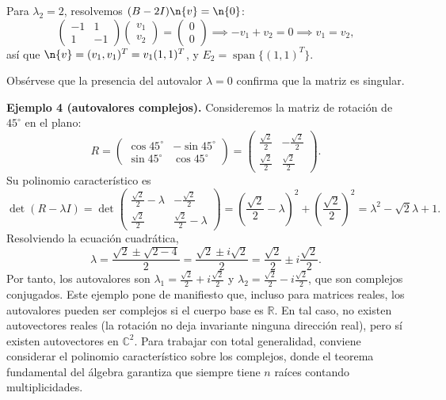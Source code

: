 Para $\lambda_2 = 2$, resolvemos $(B - 2I)\n{v} = \n{0}$:
\[
\begin{pmatrix} -1 & 1 \\ 1 & -1 \end{pmatrix} \begin{pmatrix} v_1 \\ v_2 \end{pmatrix} = \begin{pmatrix} 0 \\ 0 \end{pmatrix}
\implies -v_1 + v_2 = 0 \implies v_1 = v_2,
\]
así que $\n{v} = (v_1, v_1)^T = v_1(1,1)^T$, y $E_2 = \operatorname{span}\{(1,1)^T\}$.

Obsérvese que la presencia del autovalor $\lambda=0$ confirma que la matriz es singular.

\medskip

\noindent \textbf{Ejemplo 4 (autovalores complejos).} Consideremos la matriz de rotación de $45^\circ$ en el plano:
\[
R = \begin{pmatrix} \cos 45^\circ & -\sin 45^\circ \\ \sin 45^\circ & \cos 45^\circ \end{pmatrix}
= \begin{pmatrix} \frac{\sqrt{2}}{2} & -\frac{\sqrt{2}}{2} \\[2mm] \frac{\sqrt{2}}{2} & \frac{\sqrt{2}}{2} \end{pmatrix}.
\]
Su polinomio característico es
\[
\det(R - \lambda I) = \det\begin{pmatrix} \frac{\sqrt{2}}{2}-\lambda & -\frac{\sqrt{2}}{2} \\[1mm] \frac{\sqrt{2}}{2} & \frac{\sqrt{2}}{2}-\lambda \end{pmatrix}
= \left(\frac{\sqrt{2}}{2}-\lambda\right)^2 + \left(\frac{\sqrt{2}}{2}\right)^2
= \lambda^2 - \sqrt{2}\lambda + 1.
\]
Resolviendo la ecuación cuadrática,
\[
\lambda = \frac{\sqrt{2} \pm \sqrt{2 - 4}}{2} = \frac{\sqrt{2} \pm i\sqrt{2}}{2}
= \frac{\sqrt{2}}{2} \pm i\frac{\sqrt{2}}{2}.
\]
Por tanto, los autovalores son $\lambda_1 = \frac{\sqrt{2}}{2} + i\frac{\sqrt{2}}{2}$ y $\lambda_2 = \frac{\sqrt{2}}{2} - i\frac{\sqrt{2}}{2}$, que son complejos conjugados. Este ejemplo pone de manifiesto que, incluso para matrices reales, los autovalores pueden ser complejos si el cuerpo base es $\mathbb{R}$. En tal caso, no existen autovectores reales (la rotación no deja invariante ninguna dirección real), pero sí existen autovectores en $\mathbb{C}^2$. Para trabajar con total generalidad, conviene considerar el polinomio característico sobre los complejos, donde el teorema fundamental del álgebra garantiza que siempre tiene $n$ raíces contando multiplicidades.

